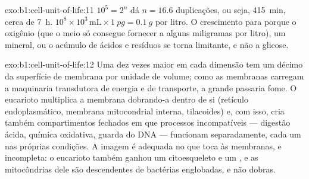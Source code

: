 \begin{solution}{exo:b1:cell-unit-of-life:11}
$10^5 = 2^{n}$ dá $n = 16.6$ duplicações, ou seja, \qty{415}{min},
cerca de \qty{7}{h}.
$10^8\times 10^3\,\mathrm{mL}\times\qty{1}{pg} = \qty{0.1}{g}$ por
litro. O crescimento para porque o oxigênio (que o meio só consegue
fornecer a alguns miligramas por litro), um mineral, ou o acúmulo de
ácidos e resíduos se torna limitante, e não a glicose.
\end{solution}

\begin{solution}{exo:b1:cell-unit-of-life:12}
Uma  dez vezes maior em cada dimensão tem um décimo da superfície
de membrana por unidade de volume; como as membranas carregam a
maquinaria transdutora de energia e de transporte, a  grande
passaria fome. O eucarioto multiplica a membrana dobrando-a dentro de si
(retículo endoplasmático, membrana mitocondrial interna, tilacoides) e,
com isso, cria também compartimentos fechados em que processos
incompatíveis --- digestão ácida, química oxidativa, guarda do DNA ---
funcionam separadamente, cada um nas próprias condições. A imagem é
adequada no que toca às membranas, e incompleta: o eucarioto também
ganhou um citoesqueleto e um , e as mitocôndrias dele são
descendentes de bactérias englobadas, e não dobras.
\end{solution}


